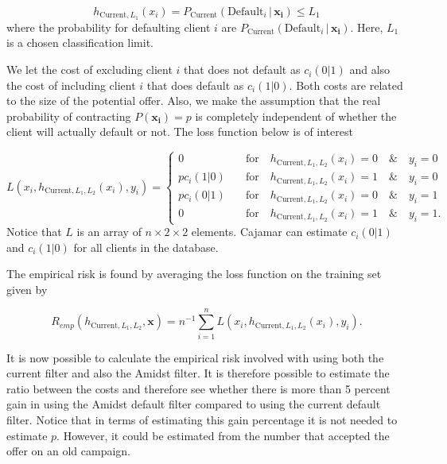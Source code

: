 \documentclass{article}
\theoremstyle{theorem}
\theoremstyle{definition}
\newcommand{\bv}[1]{\bm{#1}}
\begin{document}
\begin{equation}
\label{def:empRisk}
h_{\mbox{Current},L_1}(x_i) = P_{\mbox{Current}}(\mbox{Default}_i \,|\, \bv{x_i}) \leq L_1 
\end{equation}
where the probability for defaulting client $i$ are $P_{\mbox{Current}}(\mbox{Default}_i \,|\, \bv{x_i})$.  Here, $L_1$ is a chosen classification limit. 

We let the cost of excluding client $i$ that does not default as $c_i(0|1)$ and also the cost of including client $i$ that does default as $c_i(1|0)$.  Both costs are related to the size of the potential offer.  Also, we make the assumption that the real probability of contracting $P(\bv{x_i}) = p$ is completely independent of whether the client will actually default or not.  The loss function below is of interest

\begin{equation}
\label{def:empRiskBank}
L(x_i, h_{\mbox{Current},L_1,L_2}(x_i) , y_i) = 
\begin{cases}
0     &\quad \mbox{for} \quad h_{\mbox{Current},L_1,L_2}(x_i) = 0 \quad \& \quad y_i = 0\\
p c_i(1|0)    &\quad \mbox{for} \quad h_{\mbox{Current},L_1,L_2}(x_i) = 1 \quad \& \quad y_i = 0\\
p c_i(0|1)      &\quad \mbox{for} \quad h_{\mbox{Current},L_1,L_2}(x_i) = 0 \quad \& \quad y_i = 1\\
0   &\quad \mbox{for} \quad h_{\mbox{Current},L_1,L_2}(x_i) = 1 \quad \& \quad y_i = 1.
\end{cases}
\end{equation}
Notice that $L$ is an array of $n \times 2\times 2$ elements. Cajamar can estimate $c_i(0|1)$ and $c_i(1|0)$ for all clients in the database.

The empirical risk is found by averaging the loss function on the training set given by 

\begin{equation}
\label{def:empRisk}
R_{emp}(h_{\mbox{Current},L_1,L_2}, \bv{x}) = n^{-1} \sum_{i=1}^n L(x_i, h_{\mbox{Current},L_1,L_2}(x_i), y_i).
\end{equation}

It is now possible to calculate the empirical risk involved with using both the current filter and also the Amidst filter.  It is therefore possible to estimate the ratio between the costs and therefore see whether there is more than 5 percent gain in using the Amidst default filter compared to using the current default filter.  Notice that in terms of estimating this gain percentage it is not needed to estimate $p$.  However, it could be estimated from the number that accepted the offer on an old campaign.
\end{document}

